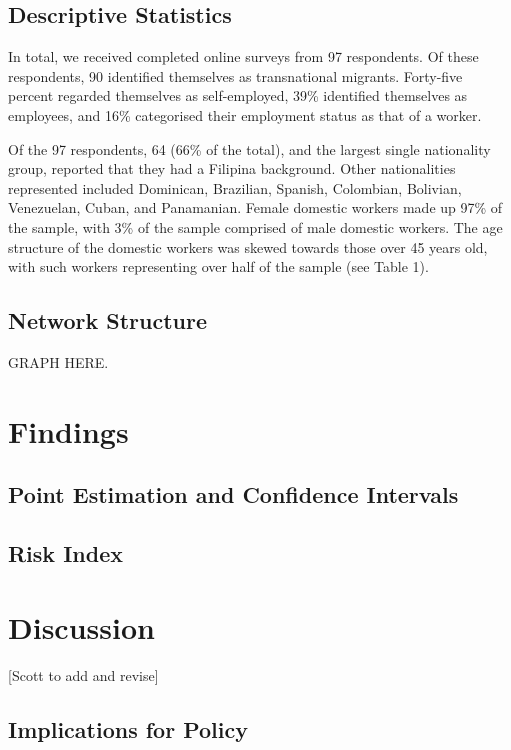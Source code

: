 \documentclass[
  12pt,
  letterpaper,
  DIV=11,
  numbers=noendperiod]{scrartcl}
\theoremstyle{plain}
\theoremstyle{definition}
\begin{document}
\subsection{Descriptive Statistics}\label{descriptive-statistics}

In total, we received completed online surveys from 97 respondents. Of
these respondents, 90 identified themselves as transnational migrants.
Forty-five percent regarded themselves as self-employed, 39\% identified
themselves as employees, and 16\% categorised their employment status as
that of a worker.

Of the 97 respondents, 64 (66\% of the total), and the largest single
nationality group, reported that they had a Filipina background. Other
nationalities represented included Dominican, Brazilian, Spanish,
Colombian, Bolivian, Venezuelan, Cuban, and Panamanian. Female domestic
workers made up 97\% of the sample, with 3\% of the sample comprised of
male domestic workers. The age structure of the domestic workers was
skewed towards those over 45 years old, with such workers representing
over half of the sample (see Table 1).

\subsection{Network Structure}\label{network-structure}

GRAPH HERE.

\section{Findings}\label{findings}

\subsection{Point Estimation and Confidence
Intervals}\label{point-estimation-and-confidence-intervals}

\subsection{Risk Index}\label{risk-index}

\section{Discussion}\label{discussion}

{[}Scott to add and revise{]}

\subsection{Implications for Policy}\label{implications-for-policy}
\end{document}
